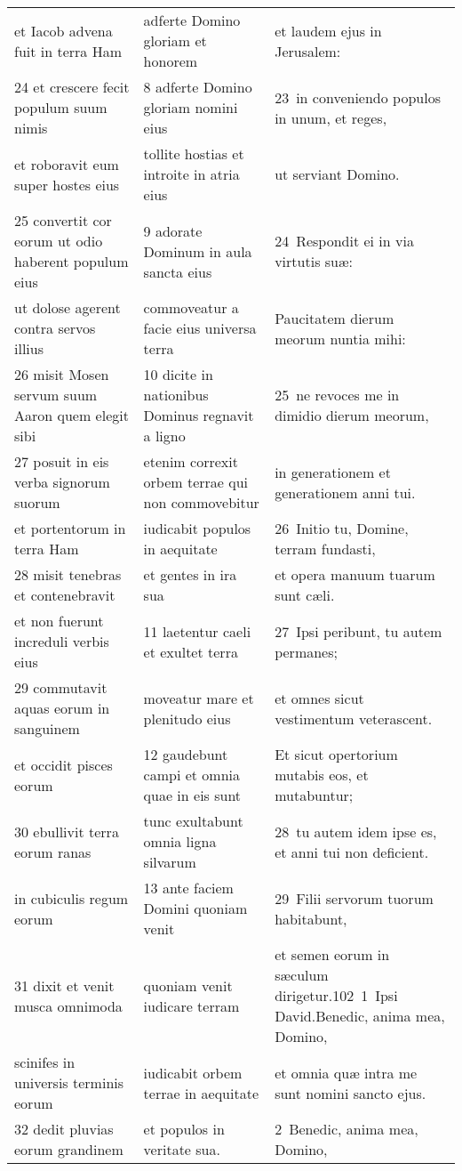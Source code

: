 \documentclass{article}
\begin{document}
\begin{longtable}{@{}p{}p{}p{}@{}}
et Iacob advena fuit in terra Ham	&	adferte Domino gloriam et honorem	&	et laudem ejus in Jerusalem:	\\
24 et crescere fecit populum suum nimis	&	8 adferte Domino gloriam nomini eius	&	23 in conveniendo populos in unum, et reges,	\\
et roboravit eum super hostes eius	&	tollite hostias et introite in atria eius	&	ut serviant Domino.	\\
25 convertit cor eorum ut odio haberent populum eius	&	9 adorate Dominum in aula sancta eius	&	24 Respondit ei in via virtutis suæ:	\\
ut dolose agerent contra servos illius	&	commoveatur a facie eius universa terra	&	Paucitatem dierum meorum nuntia mihi:	\\
26 misit Mosen servum suum Aaron quem elegit sibi	&	10 dicite in nationibus Dominus regnavit a ligno	&	25 ne revoces me in dimidio dierum meorum,	\\
27 posuit in eis verba signorum suorum	&	etenim correxit orbem terrae qui non commovebitur	&	in generationem et generationem anni tui.	\\
et portentorum in terra Ham	&	iudicabit populos in aequitate	&	26 Initio tu, Domine, terram fundasti,	\\
28 misit tenebras et contenebravit	&	et gentes in ira sua	&	et opera manuum tuarum sunt cæli.	\\
et non fuerunt increduli verbis eius	&	11 laetentur caeli et exultet terra	&	27 Ipsi peribunt, tu autem permanes;	\\
29 commutavit aquas eorum in sanguinem	&	moveatur mare et plenitudo eius	&	et omnes sicut vestimentum veterascent.	\\
et occidit pisces eorum	&	12 gaudebunt campi et omnia quae in eis sunt	&	Et sicut opertorium mutabis eos, et mutabuntur;	\\
30 ebullivit terra eorum ranas	&	tunc exultabunt omnia ligna silvarum	&	28 tu autem idem ipse es, et anni tui non deficient.	\\
in cubiculis regum eorum	&	13 ante faciem Domini quoniam venit	&	29 Filii servorum tuorum habitabunt,	\\
31 dixit et venit musca omnimoda	&	quoniam venit iudicare terram	&	et semen eorum in sæculum dirigetur.102 1 Ipsi David.Benedic, anima mea, Domino,	\\
scinifes in universis terminis eorum	&	iudicabit orbem terrae in aequitate	&	et omnia quæ intra me sunt nomini sancto ejus.	\\
32 dedit pluvias eorum grandinem	&	et populos in veritate sua.	&	2 Benedic, anima mea, Domino,	\\

\end{longtable}
\end{document}
